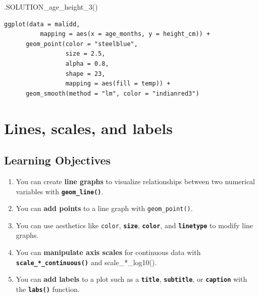 \documentclass[
  letterpaper,
  DIV=11,
  numbers=noendperiod]{scrreprt}
\newenvironment{Shaded}{\begin{snugshade}}{\end{snugshade}}
\newcommand{\FunctionTok}[1]{\textcolor[rgb]{0.28,0.35,0.67}{#1}}
\newcommand{\NormalTok}[1]{\textcolor[rgb]{0.00,0.23,0.31}{#1}}
\providecommand{\tightlist}{%
  \setlength{\itemsep}{0pt}\setlength{\parskip}{0pt}}\usepackage{longtable,booktabs,array}
\begin{document}
\begin{Shaded}
\begin{Highlighting}[]
\FunctionTok{.SOLUTION\_age\_height\_3}\NormalTok{()}
\end{Highlighting}
\end{Shaded}

\begin{verbatim}
ggplot(data = malidd, 
          mapping = aes(x = age_months, y = height_cm)) + 
      geom_point(color = "steelblue",
                 size = 2.5,
                 alpha = 0.8,
                 shape = 23,
                 mapping = aes(fill = temp)) +
      geom_smooth(method = "lm", color = "indianred3")
\end{verbatim}


\hypertarget{lines-scales-and-labels}{%
\chapter{Lines, scales, and labels}\label{lines-scales-and-labels}}

\hypertarget{learning-objectives-2}{%
\section{Learning Objectives}\label{learning-objectives-2}}

\begin{enumerate}
\def\labelenumi{\arabic{enumi}.}
\tightlist
\item
  You can create \textbf{line graphs} to visualize relationships between
  two numerical variables with \textbf{\texttt{geom\_line()}}.
\item
  You can \textbf{add points} to a line graph with
  \texttt{geom\_point()}.
\item
  You can use aesthetics like \texttt{color}, \textbf{\texttt{size}},
  \textbf{\texttt{color}}, and \textbf{\texttt{linetype}} to modify line
  graphs.
\item
  You can \textbf{manipulate axis scales} for continuous data with
  \textbf{\texttt{scale\_*\_continuous()}} and scale\_*\_log10().
\item
  You can \textbf{add labels} to a plot such as a
  \textbf{\texttt{title}}, \textbf{\texttt{subtitle}}, or
  \textbf{\texttt{caption}} with the \textbf{\texttt{labs()}} function.
\end{enumerate}
\end{document}
